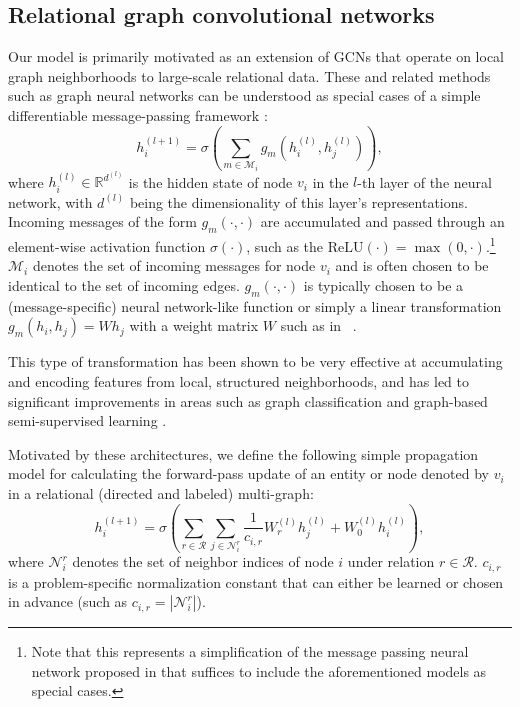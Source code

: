 \documentclass[letterpaper]{article} \usepackage{aaai18}  \usepackage{times}  \usepackage{helvet}  \usepackage{courier}  \usepackage{url}  \usepackage{graphicx}  \frenchspacing
\newcommand{\citet}[1]{\citeauthor{#1}~\shortcite{#1}}
\begin{document}
\subsection{Relational graph convolutional networks}
Our model is primarily motivated as an extension of GCNs that operate on local graph neighborhoods \cite{duvenaud2015convolutional,kipf2016semi} to large-scale relational data. These and related methods such as graph neural networks \cite{scarselli2009graph} can be understood as special cases of a simple differentiable message-passing framework \cite{gilmer2017neural}:
\begin{equation}
\label{eq:message-passing}
h_i^{(l+1)}= \sigma \left( \sum_{m \in \mathcal{M}_i} g_m(h_i^{(l)}, h_j^{(l)}) \right),
\end{equation}
where $h_i^{(l)}\in\mathbb{R}^{d^{(l)}}$ is the hidden state of node $v_i$ in the $l$-th layer of the neural network, with $d^{(l)}$ being the dimensionality of this layer's representations. Incoming messages of the form $g_m(\cdot, \cdot)$ are accumulated and passed through an element-wise activation function $\sigma(\cdot)$, such as the $\mathrm{ReLU}(\cdot)=\max(0,\cdot)$.\footnote{Note that this represents a simplification of the message passing neural network proposed in \cite{gilmer2017neural} that suffices to include the aforementioned models as special cases.} $\mathcal{M}_i$ denotes the set of incoming messages for node $v_i$ and is often chosen to be identical to the set of incoming edges. $g_m(\cdot, \cdot)$ is typically chosen to be a (message-specific) neural network-like function or simply a linear transformation $g_m(h_i, h_j)=W h_j$ with a weight matrix $W$ such as in \citet{kipf2016semi}.

This type of transformation has been shown to be very effective at accumulating and encoding features from local, structured neighborhoods, and has led to significant improvements in areas such as graph classification \cite{duvenaud2015convolutional} and graph-based semi-supervised learning \cite{kipf2016semi}.

Motivated by these architectures, we define the following simple propagation model for calculating the forward-pass update of an entity or node denoted by $v_i$ in a relational (directed and labeled) multi-graph:
\begin{equation}
\label{eq:layer}
h_i^{(l+1)}= \sigma \left( \sum_{r \in \mathcal{R}}\sum_{j \in \mathcal{N}^r_i} \frac{1}{c_{i,r}}W_r^{(l)} h_j^{(l)} + W_0^{(l)}h_i^{(l)} \right),
\end{equation}
where $\mathcal{N}^r_i$ denotes the set of neighbor indices of node $i$ under relation $r\in\mathcal{R}$. $c_{i,r}$ is a problem-specific normalization constant that can either be learned or chosen in advance (such as $c_{i,r}=|\mathcal{N}^r_i|$).
\end{document}
